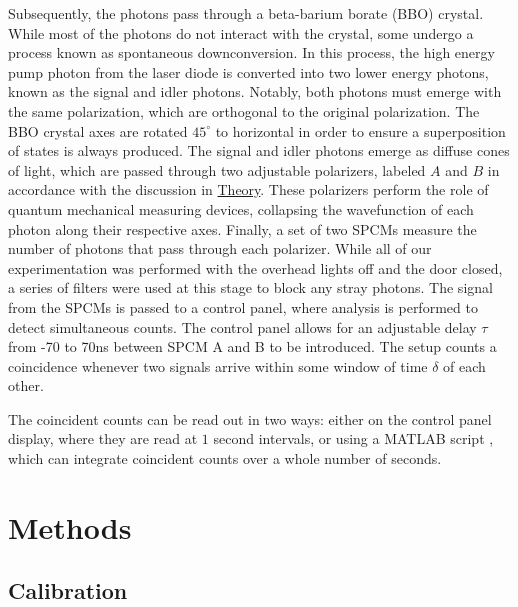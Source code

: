 \documentclass[letter,scriptaddress,twocolumn, prl, nofootinbib]{revtex4}
\begin{document}
Subsequently, the photons pass through a beta-barium borate (BBO) crystal. While most of the photons do not interact with the crystal, some undergo a process known as spontaneous downconversion. In this process, the high energy pump photon from the laser diode is converted into two lower energy photons, known as the signal and idler photons. Notably, both photons must emerge with the same polarization, which are orthogonal to the original polarization. The BBO crystal axes are rotated $45^\circ$ to horizontal in order to ensure a superposition of states is always produced. The signal and idler photons emerge as diffuse cones of light, which are passed through two adjustable polarizers, labeled $A$ and $B$ in accordance with the discussion in \hyperref[subsec:theory]{Theory}. These polarizers perform the role of quantum mechanical measuring devices, collapsing the wavefunction of each photon along their respective axes. Finally, a set of two SPCMs measure the number of photons that pass through each polarizer. While all of our experimentation was performed with the overhead lights off and the door closed, a series of filters were used at this stage to block any stray photons. The signal from the SPCMs is passed to a control panel, where analysis is performed to detect simultaneous counts. The control panel allows for an adjustable delay $\tau$ from -70 to 70ns between SPCM A and B to be introduced. The setup counts a coincidence whenever two signals arrive within some window of time $\delta$ of each other.


The coincident counts can be read out in two ways: either on the control panel display, where they are read at $1$ second intervals, or using a MATLAB script \cite{luengo_andres-luengoalden-andres-max-most-dangerous-4450-trio_2026}, which can integrate coincident counts over a whole number of seconds.


\section{Methods}
\label{sec:methods}
\subsection{Calibration}\label{sec:calibration}
\end{document}
